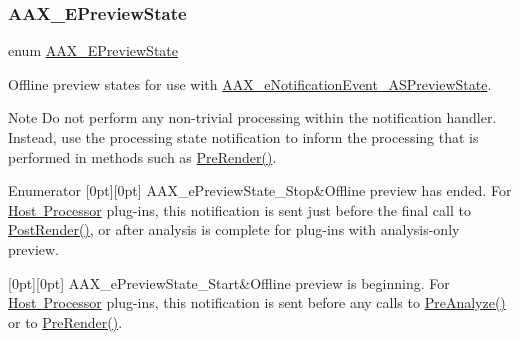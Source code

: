 \subsubsection{\texorpdfstring{AAX\_EPreviewState}{AAX\_EPreviewState}}
{\footnotesize\ttfamily enum \mbox{\hyperlink{a00491_a12b280d7ccf22568759f8deb1fe1d6a8}{A\+A\+X\+\_\+\+E\+Preview\+State}}}



Offline preview states for use with \mbox{\hyperlink{a00491_afab5ea2cfd731fc8f163b6caa685406ea8ca3f7d5e93eecf945682f6fc55f5263}{A\+A\+X\+\_\+e\+Notification\+Event\+\_\+\+A\+S\+Preview\+State}}. 

\begin{DoxyNote}{Note}
Do not perform any non-\/trivial processing within the notification handler. Instead, use the processing state notification to inform the processing that is performed in methods such as \mbox{\hyperlink{a01485_a20a99c657e4d12f446e965c567fdd711}{Pre\+Render()}}. 
\end{DoxyNote}
\begin{DoxyEnumFields}{Enumerator}
[0pt][0pt]{}\mbox{\label{a00491_a12b280d7ccf22568759f8deb1fe1d6a8a70cc710d78a2ea494e2c251da8856c6e}} 
A\+A\+X\+\_\+e\+Preview\+State\+\_\+\+Stop&Offline preview has ended. For \mbox{\hyperlink{a00804}{Host Processor}} plug-\/ins, this notification is sent just before the final call to \mbox{\hyperlink{a01693_afafcab62ae4b4174a9f81350bba2da9f}{Post\+Render()}}, or after analysis is complete for plug-\/ins with analysis-\/only preview. \\
\hline

[0pt][0pt]{}\mbox{\label{a00491_a12b280d7ccf22568759f8deb1fe1d6a8a57da8c1b6b2ad294a707bb3ccf0fd68d}} 
A\+A\+X\+\_\+e\+Preview\+State\+\_\+\+Start&Offline preview is beginning. For \mbox{\hyperlink{a00804}{Host Processor}} plug-\/ins, this notification is sent before any calls to \mbox{\hyperlink{a01693_a7d816bdb7b3b683aa2245a179d61d70e}{Pre\+Analyze()}} or to \mbox{\hyperlink{a01693_aac48c69e51b81cc59c7b6807c1c7f9ed}{Pre\+Render()}}. \\
\hline

\end{DoxyEnumFields}
\mbox{\label{a00491_a6ec854be40c8cf810dec97de3e56c0a7}} 
